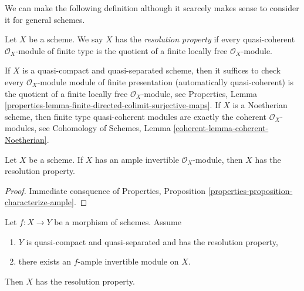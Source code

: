 \medskip\noindent
We can make the following definition although it scarcely makes
sense to consider it for general schemes.

\begin{definition}
\label{definition-resolution-property}
Let $X$ be a scheme. We say $X$ has the {\it resolution property}
if every quasi-coherent $\mathcal{O}_X$-module of finite type
is the quotient of a finite locally free $\mathcal{O}_X$-module.
\end{definition}

\noindent
If $X$ is a quasi-compact and quasi-separated scheme, then it suffices to check
every $\mathcal{O}_X$-module module of finite presentation (automatically
quasi-coherent) is the quotient of a finite locally free
$\mathcal{O}_X$-module, see Properties, Lemma
\ref{properties-lemma-finite-directed-colimit-surjective-maps}.
If $X$ is a Noetherian scheme, then finite type quasi-coherent modules
are exactly the coherent $\mathcal{O}_X$-modules, see
Cohomology of Schemes, Lemma \ref{coherent-lemma-coherent-Noetherian}.

\begin{lemma}
\label{lemma-resolution-property-ample}
Let $X$ be a scheme. If $X$ has an ample invertible $\mathcal{O}_X$-module,
then $X$ has the resolution property.
\end{lemma}

\begin{proof}
Immediate consquence of Properties, Proposition
\ref{properties-proposition-characterize-ample}.
\end{proof}

\begin{lemma}
\label{lemma-resolution-property-ample-relative}
Let $f : X \to Y$ be a morphism of schemes. Assume
\begin{enumerate}
\item $Y$ is quasi-compact and quasi-separated and has the resolution property,
\item there exists an $f$-ample invertible module on $X$.
\end{enumerate}
Then $X$ has the resolution property.
\end{lemma}

